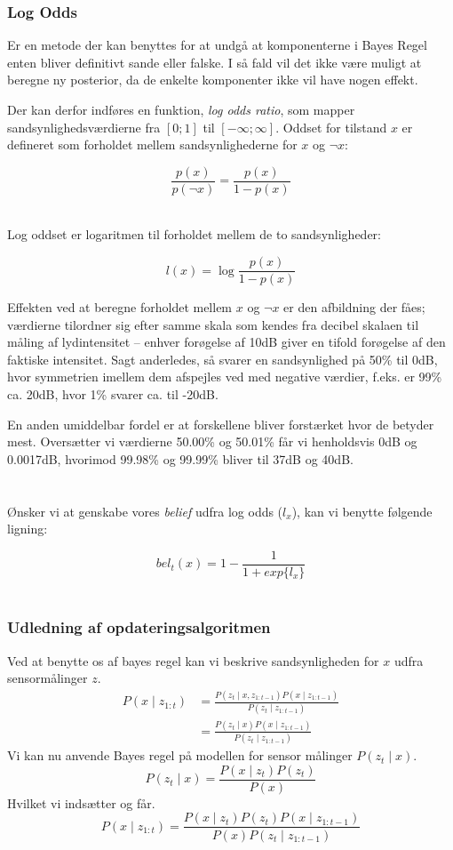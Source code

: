 \subsubsection{Log Odds}
Er en metode der kan benyttes for at undgå at komponenterne i Bayes Regel enten bliver definitivt sande eller falske.
I så fald vil det ikke være muligt at beregne ny posterior, da de enkelte komponenter ikke vil have nogen effekt.

Der kan derfor indføres en funktion, \textit{log odds ratio}, som mapper sandsynlighedsværdierne fra $[0;1]$ til $[-\infty;\infty]$.
Oddset for tilstand $x$ er defineret som forholdet mellem sandsynlighederne for $x$ og $\lnot x$: 

$$\frac{p(x)}{p(\lnot x)} = \frac{p(x)}{1 - p(x)}$$ 

\cite[s. 94]{probabilisticRobotics} \\

Log oddset er logaritmen til forholdet mellem de to sandsynligheder:

$$l(x) = \log \frac{p(x)}{1 - p(x)}$$

Effekten ved at beregne forholdet mellem $x$ og $\neg x$ er den afbildning der fåes; værdierne tilordner sig efter samme skala som kendes fra decibel skalaen til måling af lydintensitet -- enhver forøgelse af 10dB giver en tifold forøgelse af den faktiske intensitet.
Sagt anderledes, så svarer en sandsynlighed på 50\% til 0dB, hvor symmetrien imellem dem afspejles ved med negative værdier, f.eks. er 99\% ca. 20dB, hvor 1\% svarer ca. til -20dB.

En anden umiddelbar fordel er at forskellene bliver forstærket hvor de betyder mest.
Oversætter vi værdierne 50.00\% og 50.01\% får vi henholdsvis 0dB og 0.0017dB, hvorimod 99.98\% og 99.99\% bliver til 37dB og 40dB. \\ \\
\cite[s. 2]{logodds} \\

Ønsker vi at genskabe vores \textit{belief} udfra log odds ($l_x$), kan vi benytte følgende ligning:

$$bel_t(x) = 1 - \frac{1}{1 + exp\{l_x\}}$$ \\
\cite[s. 95]{probabilisticRobotics} 

\subsubsection{Udledning af opdateringsalgoritmen}
Ved at benytte os af bayes regel kan vi beskrive sandsynligheden for $x$ udfra sensormålinger $z$.
\begin{align*}
	P(x \mid z_{1:t}) &= \frac{P(z_t \mid x, z_{1:t-1}) P(x \mid z_{1:t-1})}{P(z_t \mid z_{1:t-1})} \\
	&= \frac{P(z_t \mid x) P(x \mid z_{1:t-1})}{P(z_t \mid z_{1:t-1})}
\end{align*}
Vi kan nu anvende Bayes regel på modellen for sensor målinger $P(z_t \mid x)$.
$$P(z_t \mid x) = \frac{P(x \mid z_t) P(z_t)}{P(x)}$$
Hvilket vi indsætter og får.
$$P(x \mid z_{1:t}) = \frac{P(x \mid z_t) P(z_t) P(x \mid z_{1:t-1})}{P(x) P(z_t \mid z_{1:t-1})}$$ \\
\cite[s. 95]{probabilisticRobotics} \\

